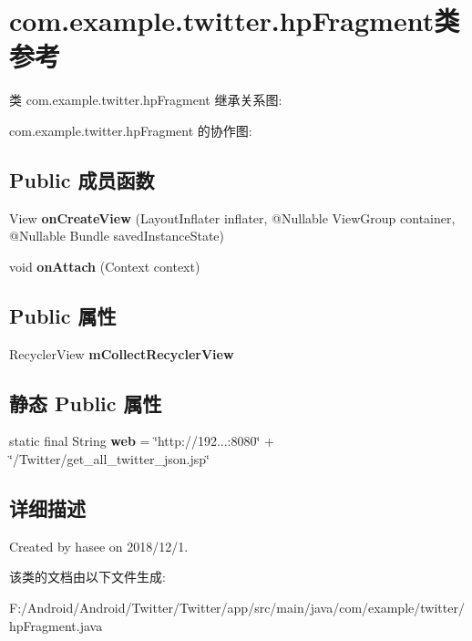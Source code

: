 \hypertarget{classcom_1_1example_1_1twitter_1_1hp_fragment}{}\section{com.\+example.\+twitter.\+hp\+Fragment类 参考}
\label{classcom_1_1example_1_1twitter_1_1hp_fragment}


类 com.\+example.\+twitter.\+hp\+Fragment 继承关系图\+:


com.\+example.\+twitter.\+hp\+Fragment 的协作图\+:
\subsection*{Public 成员函数}
\begin{DoxyCompactItemize}
\item 
\mbox{\label{classcom_1_1example_1_1twitter_1_1hp_fragment_a70a678cff86e791e477258b57ef25bb2}} 
View {\bfseries on\+Create\+View} (Layout\+Inflater inflater, @Nullable View\+Group container, @Nullable Bundle saved\+Instance\+State)
\item 
\mbox{\label{classcom_1_1example_1_1twitter_1_1hp_fragment_ad34d82a5d724090be3d412dbc6e594d7}} 
void {\bfseries on\+Attach} (Context context)
\end{DoxyCompactItemize}
\subsection*{Public 属性}
\begin{DoxyCompactItemize}
\item 
\mbox{\label{classcom_1_1example_1_1twitter_1_1hp_fragment_a8f50d2f9403e1d9f6bfab8aeb6d37358}} 
Recycler\+View {\bfseries m\+Collect\+Recycler\+View}
\end{DoxyCompactItemize}
\subsection*{静态 Public 属性}
\begin{DoxyCompactItemize}
\item 
\mbox{\label{classcom_1_1example_1_1twitter_1_1hp_fragment_a36b4bd9035c5449858fa038c429bf0cf}} 
static final String {\bfseries web} = \char`\"{}http\+://192...\+:8080\char`\"{} + \char`\"{}/Twitter/get\+\_\+all\+\_\+twitter\+\_\+json.\+jsp\char`\"{}
\end{DoxyCompactItemize}


\subsection{详细描述}
Created by hasee on 2018/12/1. 

该类的文档由以下文件生成\+:\begin{DoxyCompactItemize}
\item 
F\+:/\+Android/\+Android/\+Twitter/\+Twitter/app/src/main/java/com/example/twitter/hp\+Fragment.\+java\end{DoxyCompactItemize}
